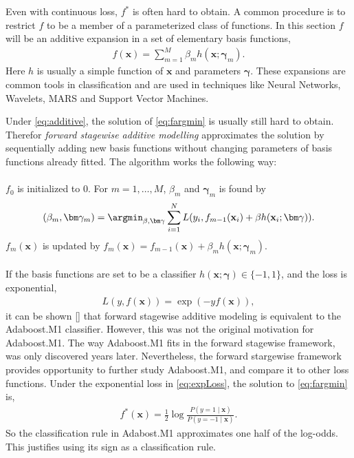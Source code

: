 Even with continuous loss, $f^*$ is often hard to obtain. A common procedure is to restrict $f$ to be a member of a parameterized class of functions. In this section $f$ will be an additive expansion in a set of elementary basis functions,
\begin{align}
  \label{eq:additive} 
  f(\mathbf{x}) =  \sum^{M}_{m=1} \beta_m h(\mathbf{x}; \bm{\gamma}_m).
\end{align}
Here $h$ is usually a simple function of $\mathbf{x}$ and parameters $\bm{\gamma}$. These expansions are common tools in classification and are used in techniques like Neural Networks, Wavelets, MARS and Support Vector Machines.

Under \eqref{eq:additive}, the solution of \eqref{eq:fargmin} is usually still hard to obtain. Therefor \textit{forward stagewise additive modelling} approximates the solution by sequentially adding new basis functions without changing parameters of basis functions already fitted. The algorithm works the following way:\\
\\
$f_0$ is initialized to 0. For $m = 1, \ldots, M$, $\beta_m$ and $\bm \gamma_m$ is found by
\begin{align}
  \label{eq:forStageWise} 
  (\beta_m, \bm \gamma_m) = \argmin_{\beta, \bm \gamma} \sum^{N}_{i=1} L(y_i, f_{m-1}(\mathbf{x}_i) + \beta h(\mathbf{x}_i; \bm \gamma)).
\end{align}
$f_m(\mathbf{x})$ is updated by $f_m(\mathbf{x}) = f_{m-1}(\mathbf{x}) + \beta_m h(\mathbf{x}; \bm \gamma_m)$.\\
\\
If the basis functions are set to be a classifier $h(\mathbf{x}; \bm \gamma) \in \{-1, 1\}$, and the loss is exponential,
\begin{align}
  \label{eq:expLoss} 
  L(y, f(\mathbf{x})) = \exp (-y f(\mathbf{x})),
\end{align}
it can be shown [\cite{modstat}] that forward stagewise additive modeling is equivalent to the Adaboost.M1 classifier. However, this was not the original motivation for Adaboost.M1. The way Adaboost.M1 fits in the forward stagewise framework, was only discovered years later. Nevertheless, the forward stargewise framework provides opportunity to further study Adaboost.M1, and compare it to other loss functions. Under the exponential loss in \eqref{eq:expLoss}, the solution to \eqref{eq:fargmin} is,
\begin{align}
  f^*( \mathbf{x}) = \frac{1}{2} \log \frac{P(y=1 \mid \mathbf{x})}{P(y=-1 \mid \mathbf{x})} .
\end{align}
So the classification rule in Adabost.M1 approximates one half of the log-odds. This justifies using its sign as a classification rule.
%
